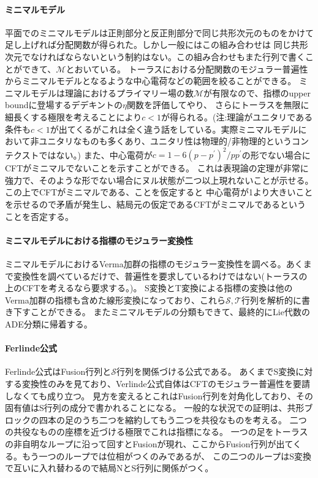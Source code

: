 \documentclass[11pt, aps, longbibliography]{article}
\numberwithin{equation}{section}
\begin{document}
    \paragraph{ミニマルモデル}
    平面でのミニマルモデルは正則部分と反正則部分で同じ共形次元のものをかけて足し上げれば分配関数が得られた。しかし一般にはこの組み合わせは
    同じ共形次元でなければならないという制約はない。この組み合わせもまた行列で書くことができて、$\mathcal{M}$とおいている。
    トーラスにおける分配関数のモジュラー普遍性からミニマルモデルとなるような中心電荷などの範囲を絞ることができる。
    ミニマルモデルは理論におけるプライマリー場の数$\mathcal{M}$が有限なので、指標のupper boundに登場するデデキントの$\eta$関数を評価してやり、
    さらにトーラスを無限に細長くする極限を考えることにより$c<1$が得られる。(注:理論がユニタリである条件も$c<1$が出てくるがこれは全く違う話をしている。実際ミニマルモデルにおいて非ユニタリなものも多くあり、ユニタリ性は物理的/非物理的というコンテクストではない。)
    また、中心電荷が$c=1-6(p-p^\prime)^2/pp^\prime$の形でない場合にCFTがミニマルでないことを示すことができる。
    これは表現論の定理が非常に強力で、そのような形でない場合にヌル状態が二つ以上現れないことが示せる。この上でCFTがミニマルである、ことを仮定すると
    中心電荷が1より大きいことを示せるので矛盾が発生し、結局元の仮定であるCFTがミニマルであるということを否定する。

    \paragraph{ミニマルモデルにおける指標のモジュラー変換性}
    ミニマルモデルにおけるVerma加群の指標のモジュラー変換性を調べる。あくまで変換性を調べているだけで、普遍性を要求しているわけではない(トーラスの上のCFTを考えるなら要求する。)。
    S変換とT変換による指標の変換は他のVerma加群の指標も含めた線形変換になっており、これら$\mathcal{S},\mathcal{T}$行列を解析的に書き下すことができる。
    またミニマルモデルの分類もできて、最終的にLie代数のADE分類に帰着する。

    \paragraph{Ferlinde公式}
    Ferlinde公式はFusion行列と$\mathcal{S}$行列を関係づける公式である。
    あくまでS変換に対する変換性のみを見ており、Verlinde公式自体はCFTのモジュラー普遍性を要請しなくても成り立つ。
    見方を変えるとこれはFusion行列を対角化しており、その固有値はS行列の成分で書かれることになる。
    一般的な状況での証明は、共形ブロックの四本の足のうち二つを縮約してもう二つを共役なものを考える。
    二つの共役なものの座標を近づける極限でこれは指標になる。
    一つの足をトーラスの非自明なループに沿って回すとFusionが現れ、ここからFusion行列が出てくる。もう一つのループでは位相がつくのみであるが、
    この二つのループはS変換で互いに入れ替わるので結局NとS行列に関係がつく。
\end{document}
